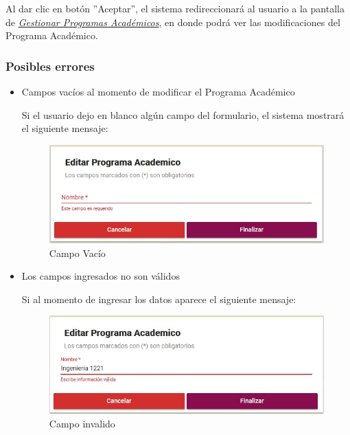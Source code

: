         Al dar clic  en botón ''Aceptar'', el sistema redireccionará al usuario a la pantalla de \hyperlink{consultarpa}{\textit{Gestionar Programas Académicos}}, en donde podrá ver las modificaciones del Programa Académico.\\

        \subsubsection{Posibles errores}

            \begin{itemize}
            	\item Campos vacíos al momento de modificar el Programa Académico

                	Si el usuario dejo en blanco algún campo del formulario, el sistema mostrará el siguiente mensaje:

                    \begin{figure}[H]
                    \centering
                    \hypertarget{vacio}{\includegraphics[width=0.7\linewidth]{images/SP3/Vacio}}
                    \caption{Campo Vacío}
                    \label{vacio}
                    \end{figure}

            	\item Los campos ingresados no son válidos

                	Si al momento de ingresar los datos aparece el siguiente mensaje:

                     \begin{figure}[H]
                    \centering
                    \hypertarget{invalido}{\includegraphics[width=0.7\linewidth]{images/SP3/Invalida}}
                    \caption{Campo invalido}
                    \label{invalido}
                    \end{figure}



\end{itemize}
